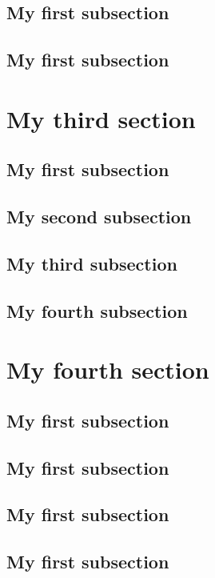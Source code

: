 \documentclass[fontsize=10pt,open=any,twocolumn]{scrbook}[2019/10/12]%
\begin{document}
        \subsection{My first subsection}
            \blindtext
        \subsection{My first subsection}
            \blindtext    
    \section{My third section}
            \blindtext
        \subsection{My first subsection}
            \blindtext
        \subsection{My second subsection}
            \blindtext     
        \subsection{My third subsection}
            \blindtext
        \subsection{My fourth subsection}
            \blindtext       
    \section{My fourth section}
            \blindtext
        \subsection{My first subsection}
            \blindtext
        \subsection{My first subsection}
            \blindtext     
        \subsection{My first subsection}
            \blindtext
        \subsection{My first subsection}
            \blindtext    
\end{document}
